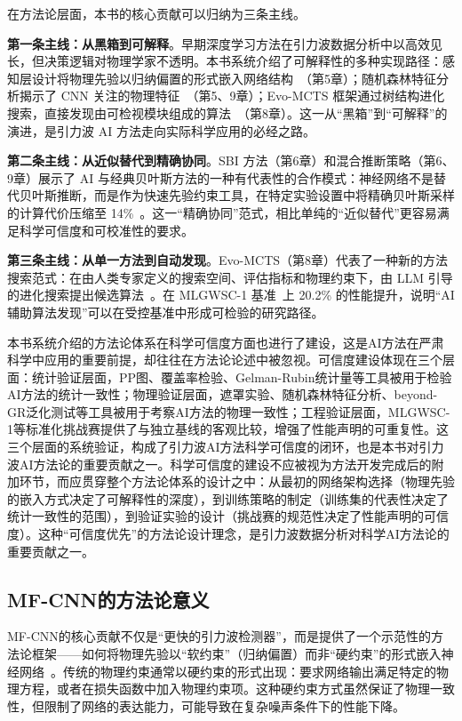 在方法论层面，本书的核心贡献可以归纳为三条主线。

\textbf{第一条主线：从黑箱到可解释}。早期深度学习方法在引力波数据分析中以高效见长，但决策逻辑对物理学家不透明。本书系统介绍了可解释性的多种实现路径：感知层设计将物理先验以归纳偏置的形式嵌入网络结构~\cite{wang2020deeplearning}（第5章）；随机森林特征分析揭示了 CNN 关注的物理特征~\cite{tian2025cnn}（第5、9章）；Evo-MCTS 框架通过树结构进化搜索，直接发现由可检视模块组成的算法~\cite{wang2025evomcts}（第8章）。这一从“黑箱”到“可解释”的演进，是引力波 AI 方法走向实际科学应用的必经之路。

\textbf{第二条主线：从近似替代到精确协同}。SBI 方法（第6章）和混合推断策略（第6、9章）展示了 AI 与经典贝叶斯方法的一种有代表性的合作模式：神经网络不是替代贝叶斯推断，而是作为快速先验约束工具，在特定实验设置中将精确贝叶斯采样的计算代价压缩至 14\%~\cite{sun2025cvae}。这一“精确协同”范式，相比单纯的“近似替代”更容易满足科学可信度和可校准性的要求。

\textbf{第三条主线：从单一方法到自动发现}。Evo-MCTS（第8章）代表了一种新的方法搜索范式：在由人类专家定义的搜索空间、评估指标和物理约束下，由 LLM 引导的进化搜索提出候选算法~\cite{wang2025evomcts}。在 MLGWSC-1 基准~\cite{schafer2023mlgwsc1}上 20.2\% 的性能提升，说明“AI 辅助算法发现”可以在受控基准中形成可检验的研究路径。

本书系统介绍的方法论体系在科学可信度方面也进行了建设，这是AI方法在严肃科学中应用的重要前提，却往往在方法论论述中被忽视。可信度建设体现在三个层面：统计验证层面，PP图、覆盖率检验、Gelman-Rubin统计量等工具被用于检验AI方法的统计一致性；物理验证层面，遮罩实验、随机森林特征分析、beyond-GR泛化测试等工具被用于考察AI方法的物理一致性；工程验证层面，MLGWSC-1等标准化挑战赛提供了与独立基线的客观比较，增强了性能声明的可重复性。这三个层面的系统验证，构成了引力波AI方法科学可信度的闭环，也是本书对引力波AI方法论的重要贡献之一。科学可信度的建设不应被视为方法开发完成后的附加环节，而应贯穿整个方法论体系的设计之中：从最初的网络架构选择（物理先验的嵌入方式决定了可解释性的深度），到训练策略的制定（训练集的代表性决定了统计一致性的范围），到验证实验的设计（挑战赛的规范性决定了性能声明的可信度）。这种“可信度优先”的方法论设计理念，是引力波数据分析对科学AI方法论的重要贡献之一。

\subsection{MF-CNN的方法论意义}

MF-CNN的核心贡献不仅是“更快的引力波检测器”，而是提供了一个示范性的方法论框架——如何将物理先验以“软约束”（归纳偏置）而非“硬约束”的形式嵌入神经网络~\cite{wang2020deeplearning}。传统的物理约束通常以硬约束的形式出现：要求网络输出满足特定的物理方程，或者在损失函数中加入物理约束项。这种硬约束方式虽然保证了物理一致性，但限制了网络的表达能力，可能导致在复杂噪声条件下的性能下降。

